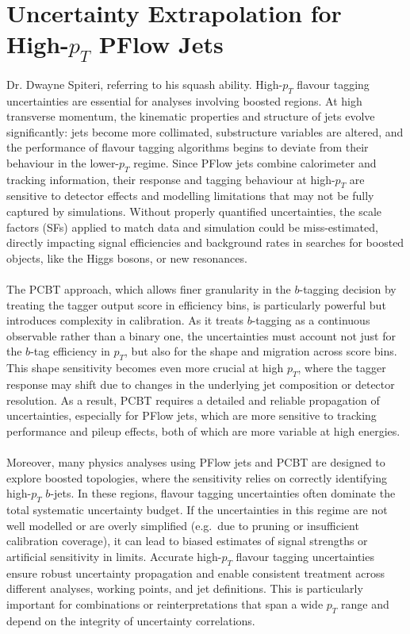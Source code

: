 \chapter{Uncertainty Extrapolation for High-$p_T$ PFlow Jets}
\label{chap:PCBTextrap}
%
{Dr. Dwayne Spiteri, referring to his squash ability.}
High-$p_T$ flavour tagging uncertainties are essential for analyses involving boosted regions. At high transverse momentum, the kinematic properties and structure of jets evolve significantly: jets become more collimated, substructure variables are altered, and the performance of flavour tagging algorithms begins to deviate from their behaviour in the lower-$p_T$ regime. Since PFlow jets combine calorimeter and tracking information, their response and tagging behaviour at high-$p_T$ are sensitive to detector effects and modelling limitations that may not be fully captured by simulations. Without properly quantified uncertainties, the scale factors (SFs) applied to match data and simulation could be miss-estimated, directly impacting signal efficiencies and background rates in searches for boosted objects, like the Higgs bosons, or new resonances.
\\
\\
The PCBT approach, which allows finer granularity in the $b$-tagging decision by treating the tagger output score in efficiency bins, is particularly powerful but introduces complexity in calibration. As it treats $b$-tagging as a continuous observable rather than a binary one, the uncertainties must account not just for the $b$-tag efficiency in $p_T$, but also for the shape and migration across score bins. This shape sensitivity becomes even more crucial at high $p_T$, where the tagger response may shift due to changes in the underlying jet composition or detector resolution. As a result, PCBT requires a detailed and reliable propagation of uncertainties, especially for PFlow jets, which are more sensitive to tracking performance and pileup effects, both of which are more variable at high energies.
\\
\\
Moreover, many physics analyses using PFlow jets and PCBT are designed to explore boosted topologies, where the sensitivity relies on correctly identifying high-$p_T$ $b$-jets. In these regions, flavour tagging uncertainties often dominate the total systematic uncertainty budget. If the uncertainties in this regime are not well modelled or are overly simplified (e.g.\ due to pruning or insufficient calibration coverage), it can lead to biased estimates of signal strengths or artificial sensitivity in limits. Accurate high-$p_T$ flavour tagging uncertainties ensure robust uncertainty propagation and enable consistent treatment across different analyses, working points, and jet definitions. This is particularly important for combinations or reinterpretations that span a wide $p_T$ range and depend on the integrity of uncertainty correlations. 
